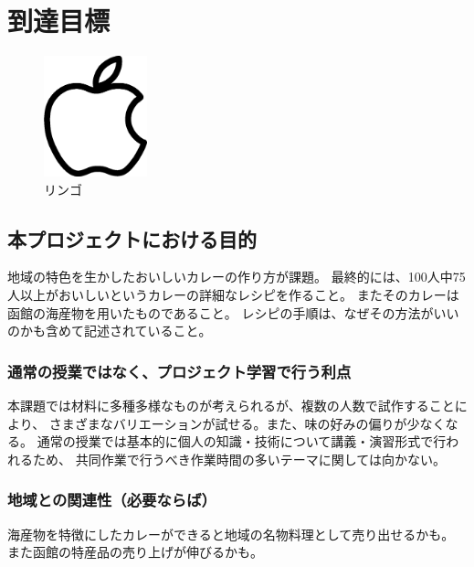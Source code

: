 \documentclass[openany,11pt,papersize]{jsbook}
\begin{document}
\chapter{到達目標}

\begin{figure}[htbp]
    \begin{center}
    \includegraphics[width=3cm]{images/apple.eps}
    \end{center}
    \caption{リンゴ}
    \label{fig:apple}
\end{figure}

\section{本プロジェクトにおける目的}\label{sec:mokuteki}

地域の特色を生かしたおいしいカレーの作り方が課題。
最終的には、100人中75人以上がおいしいというカレーの詳細なレシピを作ること。
またそのカレーは函館の海産物を用いたものであること。
レシピの手順は、なぜその方法がいいのかも含めて記述されていること。

\subsection{通常の授業ではなく、プロジェクト学習で行う利点}

本課題では材料に多種多様なものが考えられるが、複数の人数で試作することにより、 
さまざまなバリエーションが試せる。また、味の好みの偏りが少なくなる。 
通常の授業では基本的に個人の知識・技術について講義・演習形式で行われるため、 
共同作業で行うべき作業時間の多いテーマに関しては向かない。


\subsection{地域との関連性（必要ならば）}

海産物を特徴にしたカレーができると地域の名物料理として売り出せるかも。 
また函館の特産品の売り上げが伸びるかも。
\end{document}
